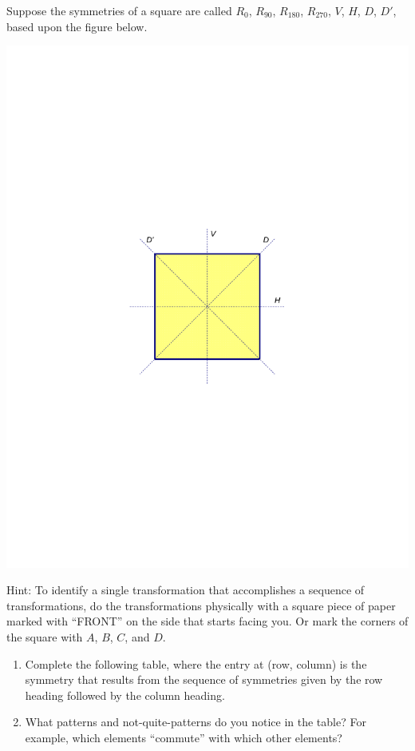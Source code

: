 \documentclass[handout,noauthor,nooutcomes]{ximera}
\begin{document}
\begin{problem}
Suppose the symmetries of a square are called $R_0$, $R_{90}$, $R_{180}$, $R_{270}$, $V$, $H$, $D$, $D'$, based upon the figure below.  
\begin{image}
\includegraphics[scale=0.6]{D4.pdf}
\end{image}
Hint:  To identify a single transformation that accomplishes a sequence of transformations, do the transformations physically with a square piece of paper marked with ``FRONT'' on the side that starts facing you.  Or mark the corners of the square with $A$, $B$, $C$, and $D$.  
\begin{enumerate}
\item Complete the following table, where the entry at (row, column) is the symmetry that results from the sequence of symmetries given by the row heading followed by the column heading.  
\item What patterns and not-quite-patterns do you notice in the table?  For example, which elements ``commute'' with which other elements?

\end{enumerate}
\end{problem}
\end{document}
